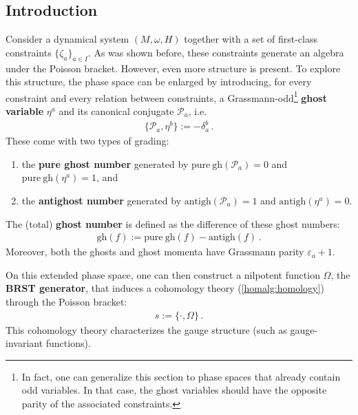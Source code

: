 \subsection{Introduction}\label{section:brst_introduction}

    Consider a dynamical system $(M,\omega,H)$ together with a set of first-class constraints $\{\zeta_a\}_{a\in I}$. As was shown before, these constraints generate an algebra under the Poisson bracket. However, even more structure is present. To explore this structure, the phase space can be enlarged by introducing, for every constraint and every relation between constraints, a Grassmann-odd\footnote{In fact, one can generalize this section to phase spaces that already contain odd variables. In that case, the ghost variables should have the opposite parity of the associated constraints.} \textbf{ghost variable} $\eta^a$ and its canonical conjugate $\mathcal{P}_a$, i.e.
    \begin{gather}
        \{\mathcal{P}_a,\eta^b\} := -\delta^b_a\,.
    \end{gather}
    These come with two types of grading:
    \begin{enumerate}
        \item the \textbf{pure ghost number} generated by $\mathrm{pure\ gh}(\mathcal{P}_a) = 0$ and $\mathrm{pure\ gh}(\eta^a) = 1$, and
        \item the \textbf{antighost number} generated by $\mathrm{antigh}(\mathcal{P}_a) = 1$ and $\mathrm{antigh}(\eta^a) = 0$.
    \end{enumerate}
    The (total) \textbf{ghost number} is defined as the difference of these ghost numbers:
    \begin{gather}
        \mathrm{gh}(f) := \mathrm{pure\ gh}(f) - \mathrm{antigh}(f)\,.
    \end{gather}
    Moreover, both the ghosts and ghost momenta have Grassmann parity $\varepsilon_a+1$.

    On this extended phase space, one can then construct a nilpotent function $\Omega$, the \textbf{BRST generator}, that induces a cohomology theory (\cref{homalg:homology}) through the Poisson bracket:
    \begin{gather}
        s := \{\cdot,\Omega\}\,.
    \end{gather}
    This cohomology theory characterizes the gauge structure (such as gauge-invariant functions).

